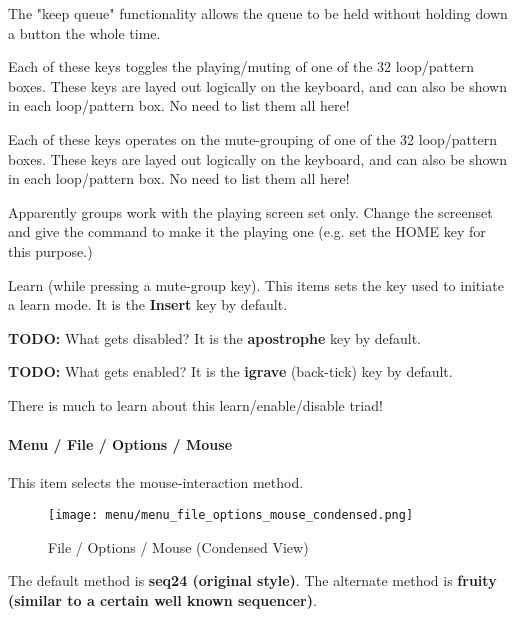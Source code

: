   The "keep queue" functionality allows the queue to be held without
   holding down a button the whole time.

   Each of these keys toggles the playing/muting of one of the 32
   loop/pattern boxes.  These keys are layed out logically on the keyboard,
   and can also be shown in each loop/pattern box.  No need to list them all
   here!

   Each of these keys operates on the mute-grouping of one of the 32
   loop/pattern boxes.  These keys are layed out logically on the keyboard,
   and can also be shown in each loop/pattern box.  No need to list them all
   here!

   Apparently groups work with the playing screen set only.
   Change the screenset and give the command to make it the playing one
   (e.g. set the HOME key for this purpose.)

   Learn (while pressing a mute-group key).
   This items sets the key used to initiate a learn mode.
   It is the \textbf{Insert} key by default.

   \textbf{TODO:}  What gets disabled?
   It is the \textbf{apostrophe} key by default.

   \textbf{TODO:} What gets enabled?
   It is the \textbf{igrave} (back-tick) key by default.

   There is much to learn about this learn/enable/disable triad!

\paragraph{Menu / File / Options / Mouse }
\label{paragraph:seq64_menu_file_options_mouse}

   This item selects the mouse-interaction method.

\begin{figure}[H]
   \centering 
   \texttt{[image: menu/menu\_file\_options\_mouse\_condensed.png]}
   \caption{File / Options / Mouse (Condensed View)}
   \label{fig:seq64_menu_file_options_mouse}
\end{figure}

   The default method is \textbf{seq24 (original style)}.
   The alternate method is \textbf{fruity (similar to a certain well known
   sequencer)}.

